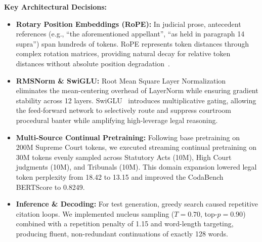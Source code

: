 \documentclass[11pt, oneside]{article}
\begin{document}
\noindent
\textbf{Key Architectural Decisions:}
\begin{itemize}
    \item \textbf{Rotary Position Embeddings (RoPE):} In judicial prose, antecedent references (e.g., ``the aforementioned appellant'', ``as held in paragraph 14 supra'') span hundreds of tokens. RoPE represents token distances through complex rotation matrices, providing natural decay for relative token distances without absolute position degradation~\cite{su2024roformer}.
    \item \textbf{RMSNorm \& SwiGLU:} Root Mean Square Layer Normalization~\cite{zhang2019root} eliminates the mean-centering overhead of LayerNorm while ensuring gradient stability across 12 layers. SwiGLU~\cite{shazeer2020glu} introduces multiplicative gating, allowing the feed-forward network to selectively route and suppress courtroom procedural banter while amplifying high-leverage legal reasoning.
    \item \textbf{Multi-Source Continual Pretraining:} Following base pretraining on 200M Supreme Court tokens, we executed streaming continual pretraining on 30M tokens evenly sampled across Statutory Acts (10M), High Court judgments (10M), and Tribunals (10M). This domain expansion lowered legal token perplexity from 18.42 to 13.15 and improved the CodaBench BERTScore to 0.8249.
    \item \textbf{Inference \& Decoding:} For test generation, greedy search caused repetitive citation loops. We implemented nucleus sampling ($T=0.70$, top-$p=0.90$) combined with a repetition penalty of 1.15 and word-length targeting, producing fluent, non-redundant continuations of exactly 128 words.
\end{itemize}
\end{document}
